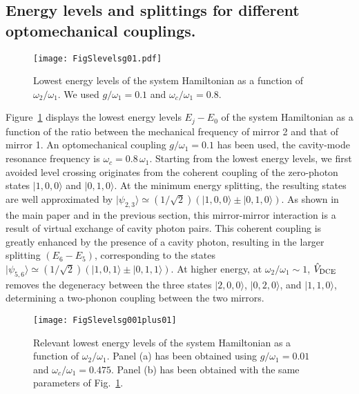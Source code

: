 \documentclass[aps,pra,twocolumn,floatfix,longbibliography, superscriptaddress]{revtex4-1}
\newcommand{\figref}[1]{\mbox{Fig.~\ref{#1}}}
\begin{document}
\newpage





\subsection{Energy levels and splittings for different optomechanical couplings.}
\label{Subsec:C}
\begin{figure}
	\centering
	\texttt{[image: FigSlevelsg01.pdf]}
	\caption{Lowest energy levels of the system Hamiltonian as a function of $\omega_2/\omega_1$. We used $g/\omega_1 = 0.1$ and $\omega_c/\omega_1 = 0.8$.
		\label{Sg01}}
\end{figure}
Figure~\ref{Sg01} displays the lowest energy levels $E_j - E_0$ of the system Hamiltonian
as a function of the ratio between the mechanical frequency
of mirror 2 and that of mirror 1. An optomechanical coupling
$g/\omega_1 = 0.1$ has been used, the cavity-mode resonance
frequency is $\omega_c = 0.8\, \omega_1$.
Starting 
from the lowest energy levels, we first avoided level crossing originates from the coherent coupling of the zero-photon states $|1,0,0 \rangle$ and $|0,1,0 \rangle$. At the minimum energy splitting, the
resulting states are well approximated by $|\psi_{2,3} \rangle \simeq (1/\sqrt{2}) (|1,0,0 \rangle \pm |0,1,0 \rangle)$.
As shown in the main paper and in the previous section, this  mirror-mirror interaction is a result of  virtual exchange of cavity photon pairs.
This coherent coupling is greatly enhanced by the presence of a cavity photon, resulting in the larger splitting $(E_6-E_5)$, corresponding to the states $|\psi_{5,6} \rangle \simeq (1/\sqrt{2}) (|1,0,1 \rangle \pm |0,1,1 \rangle)$. At higher energy, at $\omega_2 / \omega_1 \sim 1$, $\hat V_{\rm DCE}$
removes the degeneracy between the three states $|2,0,0 \rangle$, $|0,2,0 \rangle$, and $|1,1,0 \rangle$, determining a two-phonon coupling between the two mirrors. 


\begin{figure}
	\centering
	\texttt{[image: FigSlevelsg001plus01]}
	\caption{Relevant lowest energy levels of the system Hamiltonian as a function of $\omega_2/\omega_1$.  Panel (a) has been obtained using  $g/\omega_1 = 0.01$ and $\omega_c /\omega_1 = 0.475$. Panel (b) has been obtained with the same parameters of \figref{Sg01}.
		\label{Sg01001}}
\end{figure}
\end{document}
